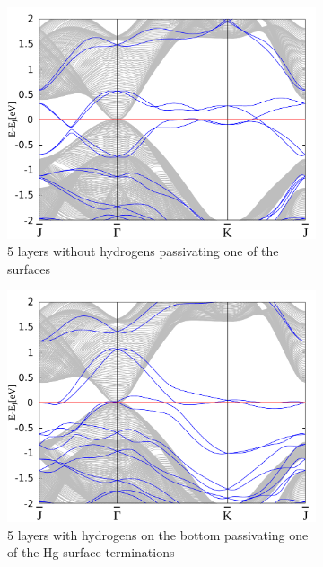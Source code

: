 	\begin{figure}[htbp]
		\begin{subfigure}[c]{.48\linewidth}
			\centering
			\includegraphics[width=\linewidth]{Hg_termination/no_H_bulk+5_layers_no_dos_-2_2.pdf}
			\caption{5 layers without hydrogens passivating one of the surfaces}
		\end{subfigure}
		\hfill
		\begin{subfigure}[c]{.48\linewidth}
			\centering
			\includegraphics[width=\linewidth]{Hg_termination/bulk+5_layers_no_dos_-2_2.pdf}
			\caption{5 layers with hydrogens on the bottom passivating one of the Hg surface terminations}
		\end{subfigure}
		\begin{subfigure}[c]{.48\linewidth}

\end{subfigure}
\end{figure}
